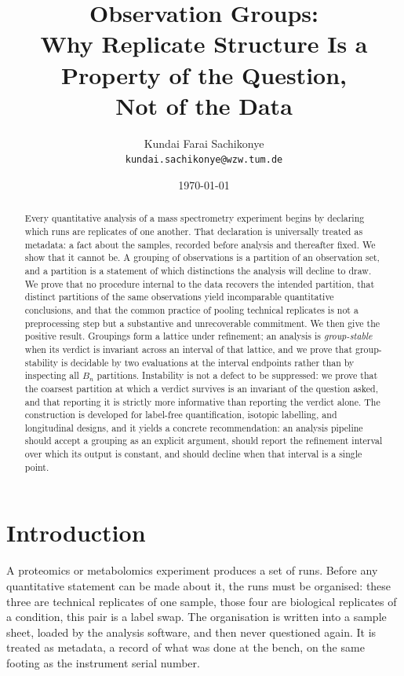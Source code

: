 \documentclass[11pt,a4paper]{article}
\title{\textbf{Observation Groups:\\[2pt]
Why Replicate Structure Is a Property of the Question,\\
Not of the Data}}
\author{Kundai Farai Sachikonye\\
\texttt{kundai.sachikonye@wzw.tum.de}}
\date{\today}
\theoremstyle{definition}
\theoremstyle{remark}
\begin{document}
\maketitle

\begin{abstract}
\noindent
Every quantitative analysis of a mass spectrometry experiment begins by
declaring which runs are replicates of one another. That declaration is
universally treated as metadata: a fact about the samples, recorded
before analysis and thereafter fixed. We show that it cannot be. A
grouping of observations is a partition of an observation set, and a
partition is a statement of which distinctions the analysis will decline
to draw. We prove that no procedure internal to the data recovers the
intended partition, that distinct partitions of the same observations
yield incomparable quantitative conclusions, and that the common practice
of pooling technical replicates is not a preprocessing step but a
substantive and unrecoverable commitment. We then give the positive
result. Groupings form a lattice under refinement; an analysis is
\emph{group-stable} when its verdict is invariant across an interval of
that lattice, and we prove that group-stability is decidable by two
evaluations at the interval endpoints rather than by inspecting all $B_n$
partitions. Instability is not a defect to be suppressed: we prove that
the coarsest partition at which a verdict survives is an invariant of the
question asked, and that reporting it is strictly more informative than
reporting the verdict alone. The construction is developed for
label-free quantification, isotopic labelling, and longitudinal designs,
and it yields a concrete recommendation: an analysis pipeline should
accept a grouping as an explicit argument, should report the refinement
interval over which its output is constant, and should decline when that
interval is a single point.
\end{abstract}

\section{Introduction}
\label{sec:intro}

A proteomics or metabolomics experiment produces a set of runs. Before
any quantitative statement can be made about it, the runs must be
organised: these three are technical replicates of one sample, those four
are biological replicates of a condition, this pair is a label swap. The
organisation is written into a sample sheet, loaded by the analysis
software, and then never questioned again. It is treated as metadata, a
record of what was done at the bench, on the same footing as the
instrument serial number.
\end{document}

